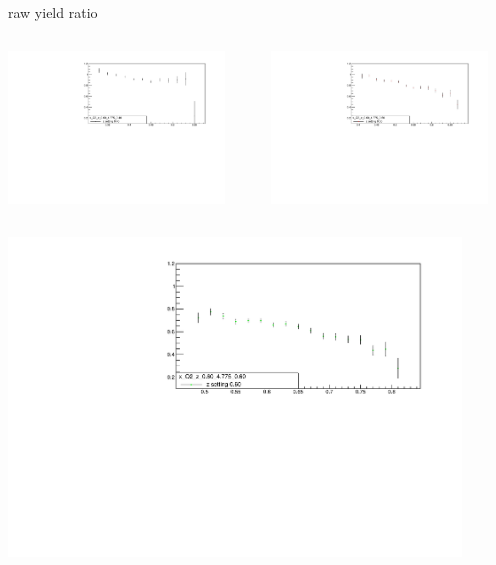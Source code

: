 \begin{frame}{raw yield ratio}
\begin{columns}
\begin{column}[T]{0.5\textwidth}
\includegraphics[width = 0.9\textwidth]{results/yield/statistics/x_Q2_z_0.60_4.775_0.40_ratio.pdf}
\end{column}
\begin{column}[T]{0.5\textwidth}
\includegraphics[width = 0.9\textwidth]{results/yield/statistics/x_Q2_z_0.60_4.775_0.50_ratio.pdf}
\end{column}
\end{columns}
\begin{columns}
\begin{column}[T]{0.5\textwidth}
\includegraphics[width = 0.9\textwidth]{results/yield/statistics/x_Q2_z_0.60_4.775_0.60_ratio.pdf}

\end{column}
\end{columns}
\end{frame}
